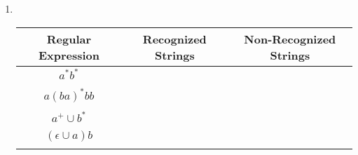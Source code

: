 \documentclass[a4paper, 12pt]{article}
\begin{document}
\begin{enumerate}
\item ~\\%
\begin{center}
	\begin{tabular}{|c|c|c|}
	\hline
	\textbf{Regular Expression} & \textbf{Recognized Strings} & \textbf{Non-Recognized Strings}\\
	\hline
	$a^*b^*$ & &\\
	\cline{2-3}
	& &\\
	\hline
	$a(ba)^*bb$ & &\\
	\cline{2-3}
	& &\\
	\hline
	$a^+ \cup b^*$ & &\\
	\cline{2-3}
	& &\\
	\hline
	$(\epsilon \cup a)b$ & &\\
	\cline{2-3}
	& &\\
	\hline
	\end{tabular}
\end{center}
\end{enumerate}


\end{document}
